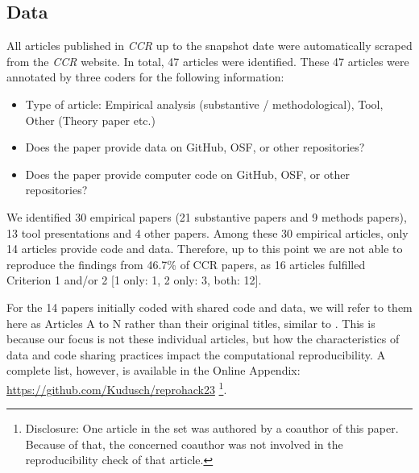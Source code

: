 \subsection{Data}%


All articles published in \textit{CCR} up to the snapshot date were automatically scraped from the \textit{CCR} website. In total, 47 articles were identified.
These 47 articles were annotated by three coders for the following information:

\begin{itemize}
  \item Type of article: Empirical analysis (substantive / methodological), Tool, Other (Theory paper etc.)
  \item Does the paper provide data on GitHub, OSF, or other repositories?
  \item Does the paper provide computer code on GitHub, OSF, or other repositories?
\end{itemize}

We identified 30 empirical papers (21 substantive papers and 9 methods papers), 13 tool presentations and 4 other papers. Among these 30 empirical articles, only 14 articles provide code and data. Therefore, up to this point we are not able to reproduce the findings from 46.7\% of CCR papers, as 16 articles fulfilled Criterion 1 and/or 2 [1 only: 1, 2 only: 3, both: 12].

For the 14 papers initially coded with shared code and data, we will refer to them here as Articles A to N rather than their original titles, similar to \textcite[]{cruewell:2023:WB}. This is because our focus is not these individual articles, but how the characteristics of data and code sharing practices impact the computational reproducibility. A complete list, however, is available in the Online Appendix: \url{https://github.com/Kudusch/reprohack23} %
\footnote{Disclosure: One article in the set %
was authored by a coauthor of this paper. Because of that, the concerned coauthor was not involved in the reproducibility check of that article.}.

